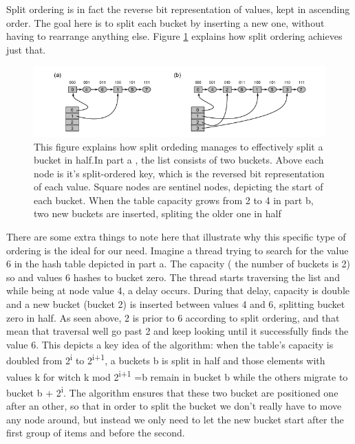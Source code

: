 Split ordering is in fact the reverse bit representation of values, kept in ascending order. The goal here is to split each bucket by inserting a new one, without having to rearrange anything else. Figure \ref{split_ordered_1} explains how split ordering achieves just that.

\begin{figure}
 \centering
  \includegraphics[scale=0.5]{split_ordered_1.png}
\caption{This figure explains how split ordeding manages to effectively split a bucket in half.In part a , the list consists of two buckets. Above each node is it's split-ordered key, which is the reversed bit representation of each value. Square nodes are sentinel nodes, depicting the start of each bucket. When the table capacity grows from 2 to 4 in  part b, two new buckets are inserted, spliting the older one in half}
\label{split_ordered_1}
\end{figure}

There are some extra things to note here that illustrate why this specific type of ordering is the ideal for our need. Imagine a thread trying to search for the value 6 in the hash table depicted in part a. The capacity ( the number of buckets is 2) so and values 6 hashes to bucket zero. The thread starts traversing the list and while being at node value 4, a delay occurs. During that delay, capacity is double and a new bucket (bucket 2) is inserted between values 4 and 6, splitting bucket zero in half. As seen above, 2 is prior to 6 according to split ordering, and that mean that traversal well go past 2 and keep looking until it successfully finds the value 6. This depicts a key idea of the algorithm: when the table's capacity is doubled from 2\textsuperscript{i} to 2\textsuperscript{i+1}, a buckets b is split in half and those elements with values k for witch k mod 2\textsuperscript{i+1} =b  remain in bucket b while the others migrate to bucket b + 2\textsuperscript{i}. The algorithm ensures that these two bucket are positioned one after an other, so that in order to split the bucket we don’t really have to move any node around, but instead we only need to let the new bucket start after the first group of items and before the second.

